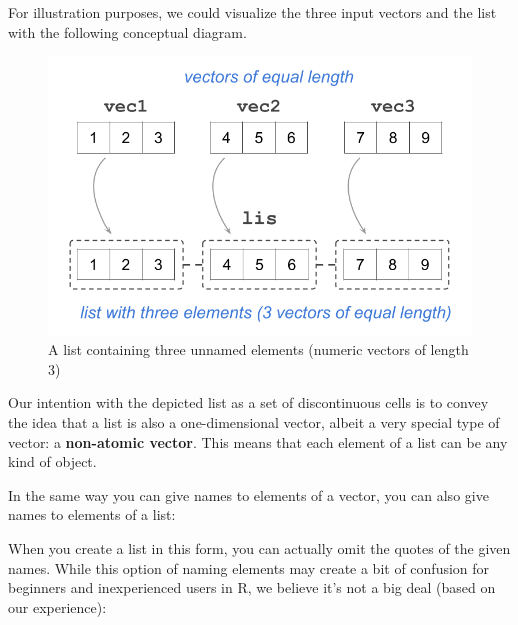 \documentclass[
]{book}
\newenvironment{Shaded}{\begin{snugshade}}{\end{snugshade}}
\newcommand{\CommentTok}[1]{\textcolor[rgb]{0.56,0.35,0.01}{\textit{#1}}}
\newcommand{\FunctionTok}[1]{\textcolor[rgb]{0.00,0.00,0.00}{#1}}
\newcommand{\NormalTok}[1]{#1}
\newcommand{\OtherTok}[1]{\textcolor[rgb]{0.56,0.35,0.01}{#1}}
\newcommand{\StringTok}[1]{\textcolor[rgb]{0.31,0.60,0.02}{#1}}
\begin{document}
For illustration purposes, we could visualize the three input vectors and the
list with the following conceptual diagram.

\begin{figure}

{\centering \includegraphics[width=0.6\linewidth]{images/objects/obj-list-vectors1} 

}

\caption{A list containing three unnamed elements (numeric vectors of length 3)}\label{fig:unnamed-chunk-112}
\end{figure}

Our intention with the depicted list as a set of discontinuous cells is to
convey the idea that a list is also a one-dimensional vector, albeit a very
special type of vector: a \textbf{non-atomic vector}. This means that each element
of a list can be any kind of object.

In the same way you can give names to elements of a vector, you can also give
names to elements of a list:

\begin{Shaded}
\end{Shaded}

When you create a list in this form, you can actually omit the quotes of
the given names. While this option of naming elements may create a bit of
confusion for beginners and inexperienced users in R, we believe it's not a big
deal (based on our experience):
\end{document}
